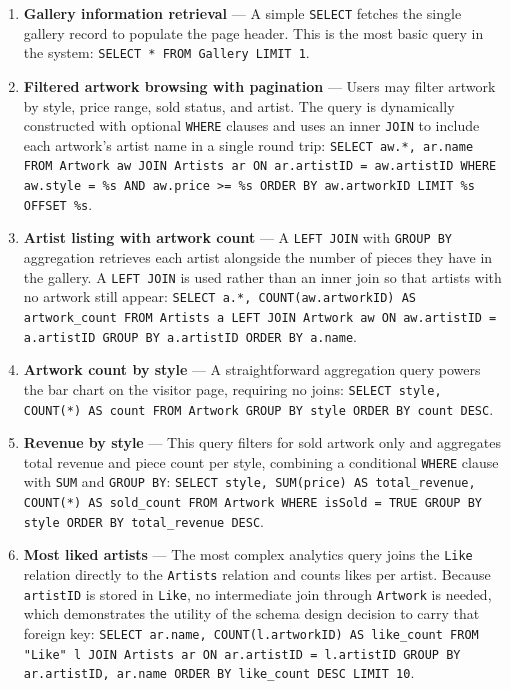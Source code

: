 \documentclass[12pt]{article}
\begin{document}
\begin{enumerate}
    \item \textbf{Gallery information retrieval} --- A simple \texttt{SELECT} fetches the single gallery record to populate the page header. This is the most basic query in the system: \texttt{SELECT * FROM Gallery LIMIT 1}.

    \item \textbf{Filtered artwork browsing with pagination} --- Users may filter artwork by style, price range, sold status, and artist. The query is dynamically constructed with optional \texttt{WHERE} clauses and uses an inner \texttt{JOIN} to include each artwork's artist name in a single round trip: \texttt{SELECT aw.*, ar.name FROM Artwork aw JOIN Artists ar ON ar.artistID = aw.artistID WHERE aw.style = \%s AND aw.price >= \%s ORDER BY aw.artworkID LIMIT \%s OFFSET \%s}.

    \item \textbf{Artist listing with artwork count} --- A \texttt{LEFT JOIN} with \texttt{GROUP BY} aggregation retrieves each artist alongside the number of pieces they have in the gallery. A \texttt{LEFT JOIN} is used rather than an inner join so that artists with no artwork still appear: \texttt{SELECT a.*, COUNT(aw.artworkID) AS artwork\_count FROM Artists a LEFT JOIN Artwork aw ON aw.artistID = a.artistID GROUP BY a.artistID ORDER BY a.name}.

    \item \textbf{Artwork count by style} --- A straightforward aggregation query powers the bar chart on the visitor page, requiring no joins: \texttt{SELECT style, COUNT(*) AS count FROM Artwork GROUP BY style ORDER BY count DESC}.

    \item \textbf{Revenue by style} --- This query filters for sold artwork only and aggregates total revenue and piece count per style, combining a conditional \texttt{WHERE} clause with \texttt{SUM} and \texttt{GROUP BY}: \texttt{SELECT style, SUM(price) AS total\_revenue, COUNT(*) AS sold\_count FROM Artwork WHERE isSold = TRUE GROUP BY style ORDER BY total\_revenue DESC}.

    \item \textbf{Most liked artists} --- The most complex analytics query joins the \texttt{Like} relation directly to the \texttt{Artists} relation and counts likes per artist. Because \texttt{artistID} is stored in \texttt{Like}, no intermediate join through \texttt{Artwork} is needed, which demonstrates the utility of the schema design decision to carry that foreign key: \texttt{SELECT ar.name, COUNT(l.artworkID) AS like\_count FROM "Like" l JOIN Artists ar ON ar.artistID = l.artistID GROUP BY ar.artistID, ar.name ORDER BY like\_count DESC LIMIT 10}.
\end{enumerate}
\end{document}
